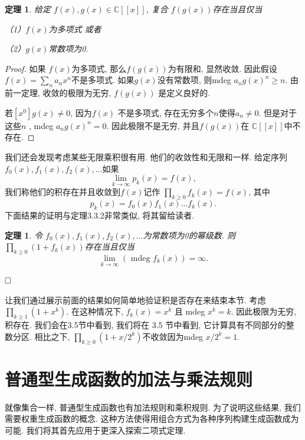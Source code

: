 \documentclass[a4paper,12pt]{ctexbook}
\newtheorem{theorem}[lemma]{\hspace{2em}定理}%
\begin{document}
\begin{theorem}
	给定 $f(x), g(x) \in \mathbb{C}[[x]]$, 复合 $f(g(x))$存在当且仅当

		（1）$f(x)$为多项式 或者

		（2）$g(x)$常数项为0.
\end{theorem}
\begin{proof}
	如果 $f(x)$为多项式, 那么$f(g(x))$为有限和, 显然收敛. 因此假设 $f(x)=\sum_{n} a_{n} x^{n}$不是多项式. 如果$g(x)$没有常数项, 则mdeg $a_{n} g(x)^{n} \geq n$. 由前一定理, 收敛的极限为无穷,  $f(g(x))$ 是定义良好的.

	若$\left[x^{0}\right] g(x) \neq 0$, 因为$f(x)$ 不是多项式, 存在无穷多个$n$使得$a_{n} \neq 0$. 但是对于这些$n$ ,  mdeg $a_{n} g(x)^{n}=0$. 因此极限不是无穷, 并且$f(g(x))$在 $\mathbb{C}[[x]]$中不存在.
\end{proof}

我们还会发现考虑某些无限乘积很有用. 他们的收敛性和无限和一样. 给定序列$f_{0}(x), f_{1}(x), f_{2}(x), \ldots$如果$$
\lim _{k \rightarrow \infty} p_{k}(x)=f(x),
$$我们称他们的积存在并且收敛到$f(x)$记作 $\prod_{k \geq 0} f_{k}(x)=f(x)$, 其中
$$
p_{k}(x)=f_{0}(x) f_{1}(x) \ldots f_{k}(x).
$$
下面结果的证明与定理3.3.2非常类似, 将其留给读者.

\begin{theorem}
	令 $f_{0}(x), f_{1}(x), f_{2}(x), \ldots$为常数项为0的幂级数. 则$\prod_{k \geq 0}\left(1+f_{k}(x)\right)$存在当且仅当$$
	\lim _{k \rightarrow \infty}\left(\text { mdeg } f_{k}(x)\right)=\infty.
	$$
\end{theorem}$ \hfill\square $

让我们通过展示前面的结果如何简单地验证积是否存在来结束本节. 考虑
$\prod_{k \geq 1}\left(1+x^{k}\right) $. 在这种情况下, $f_{k}(x)=x^{k}$ 且 mdeg $x^{k}=k$. 因此极限为无穷, 积存在. 我们会在3.5节中看到, 我们将在 3.5 节中看到, 它计算具有不同部分的整数分区. 相比之下,  $\prod_{k \geq 0}\left(1+x / 2^{k}\right)$不收敛因为mdeg $x / 2^{k}=1$.
\section{普通型生成函数的加法与乘法规则}

就像集合一样, 普通型生成函数也有加法规则和乘积规则. 为了说明这些结果, 我们需要权重生成函数的概念. 这种方法使得用组合方式为各种序列构建生成函数成为可能. 我们将其首先应用于更深入探索二项式定理.
\end{document}

